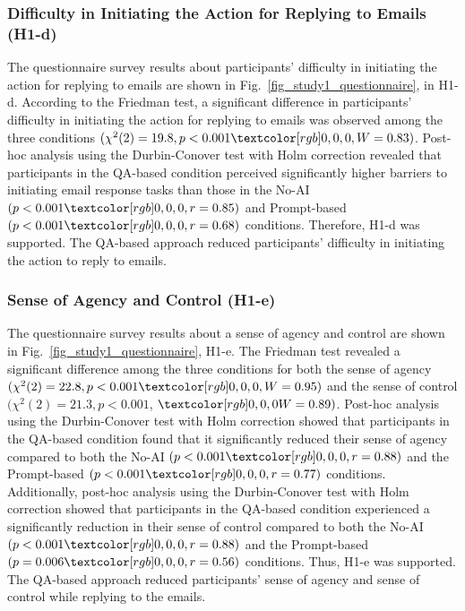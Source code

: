 \subsubsection{Difficulty in Initiating the Action for Replying to Emails (H1-d)}
\label{sec:result1_initiating}
The questionnaire survey results about participants' difficulty in initiating the action for replying to emails are shown in Fig.~\ref{fig_study1_questionnaire}, in H1-d.
According to the Friedman test, a significant difference in participants' difficulty in initiating the action for replying to emails was observed among the three conditions $(\chi^2(2)=19.8, p<0.001\red{, W=0.83})$.
Post-hoc analysis using the Durbin-Conover test with Holm correction revealed that participants in the QA-based condition perceived significantly higher barriers to initiating email response tasks than those in the No-AI $(p<0.001\red{, r=0.85})$ and Prompt-based $(p<0.001\red{, r=0.68})$ conditions.
Therefore, H1-d was supported.
The QA-based approach reduced participants’ difficulty in initiating the action to reply to emails.

\subsubsection{Sense of Agency and Control (H1-e)}
\label{sec:result1_agency}
The questionnaire survey results about a sense of agency and control are shown in Fig.~\ref{fig_study1_questionnaire}, H1-e.
The Friedman test revealed a significant difference among the three conditions for both the sense of agency $(\chi^2(2)=22.8, p<0.001\red{, W=0.95})$ and the sense of control $(\chi^2(2)=21.3, p<0.001$, $\red{W=0.89})$. 
Post-hoc analysis using the Durbin-Conover test with Holm correction showed that participants in the QA-based condition found that it significantly reduced their sense of agency compared to both the No-AI $(p<0.001\red{, r=0.88})$ and the Prompt-based $(p<0.001\red{, r=0.77})$ conditions.
Additionally, post-hoc analysis using the Durbin-Conover test with Holm correction showed that participants in the QA-based condition experienced a significantly reduction in their sense of control compared to both the No-AI $(p<0.001\red{, r=0.88})$ and the Prompt-based $(p=0.006\red{, r=0.56})$ conditions.
Thus, H1-e was supported.
The QA-based approach reduced participants’ sense of agency and sense of control while replying to the emails.

